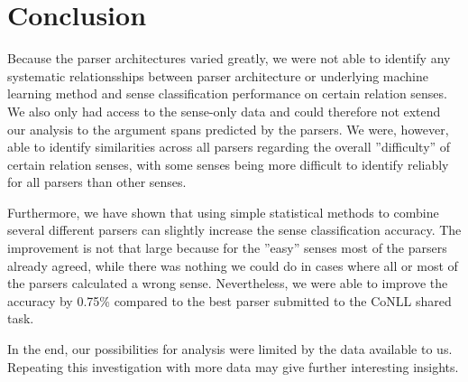 \documentclass[10pt,notitlepage]{scrartcl}
\begin{document}
\section*{Conclusion}
Because the parser architectures varied greatly, we were not able to identify any systematic relationsships between parser architecture or underlying machine learning method and sense classification performance on certain relation senses. We also only had access to the sense-only data and could therefore not extend our analysis to the argument spans predicted by the parsers. We were, however, able to identify similarities across all parsers regarding the overall ''difficulty'' of certain relation senses, with some senses being more difficult to identify reliably for all parsers than other senses.

Furthermore, we have shown that using simple statistical methods to combine several different parsers can slightly increase the sense classification accuracy. The improvement is not that large because for the ''easy'' senses most of the parsers already agreed, while there was nothing we could do in cases where all or most of the parsers calculated a wrong sense. Nevertheless, we were able to improve the accuracy by 0.75\% compared to the best parser submitted to the CoNLL shared task.

In the end, our possibilities for analysis were limited by the data available to us. Repeating this investigation with more data may give further interesting insights.
\pagebreak


\end{document}
